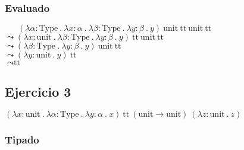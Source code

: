 \documentclass[a4paper]{article}
\newcommand{\Type}{\text{Type}}
\newcommand{\TT}{\text{tt}}
\newcommand{\Unit}{\text{unit}}
\begin{document}
\begin{landscape}
\subsubsection{Evaluado}

\noindent
$\phantom{\leadsto\ }
 (\lambda \alpha : \Type\ .\
  \lambda x : \alpha\ .\
  \lambda \beta : \Type\ .\
  \lambda y : \beta\ .\
  y)\
 \Unit\ \TT\ \Unit\ \TT$ \\
$\leadsto
 (\lambda x : \Unit\ .\
  \lambda \beta : \Type\ .\
  \lambda y : \beta\ .\
  y)\
 \TT\ \Unit\ \TT$ \\
$\leadsto
 (\lambda \beta : \Type\ .\
  \lambda y : \beta\ .\
  y)\
 \Unit\ \TT$ \\
$\leadsto
 (\lambda y : \Unit\ .\
  y)\
 \TT$ \\
$\leadsto
 \TT$




\newpage

\subsection{Ejercicio 3}

$(\lambda x : \Unit\ .\
  \lambda \alpha : \Type\ .\
  \lambda y : \alpha\ .\
  x)\
 \TT\ (\Unit \rightarrow \Unit)\
 (\lambda z : \Unit\ .\ z)$ \\


\subsubsection{Tipado}


\end{landscape}
\end{document}
